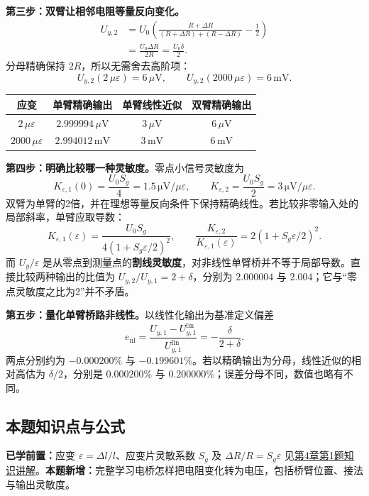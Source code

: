 \textbf{第三步：双臂让相邻电阻等量反向变化。}
\begin{align*}
U_{y,2}&=U_0\left(\frac{R+\Delta R}{(R+\Delta R)+(R-\Delta R)}-\frac12\right)\\
&=\boxed{\frac{U_0\Delta R}{2R}=\frac{U_0\delta}{2}}.
\end{align*}
分母精确保持 $2R$，所以无需舍去高阶项：
\[
\boxed{U_{y,2}(2\,\mu\varepsilon)=6\,\mu\mathrm V},\qquad
\boxed{U_{y,2}(2000\,\mu\varepsilon)=6\,\mathrm{mV}}.
\]

\begin{table}[H]
\centering\small
\begin{tabular}{@{}c c c c@{}}
\toprule
应变 & 单臂精确输出 & 单臂线性近似 & 双臂精确输出 \\
\midrule
$2\,\mu\varepsilon$ & $2.999994\,\mu\mathrm V$ & $3\,\mu\mathrm V$ & $6\,\mu\mathrm V$ \\
$2000\,\mu\varepsilon$ & $2.994012\,\mathrm{mV}$ & $3\,\mathrm{mV}$ & $6\,\mathrm{mV}$ \\
\bottomrule
\end{tabular}
\end{table}

\textbf{第四步：明确比较哪一种灵敏度。}零点小信号灵敏度为
\[
K_{\varepsilon,1}(0)=\frac{U_0S_g}{4}
=1.5\,\mathrm{\mu V}/\mu\varepsilon,
\qquad
K_{\varepsilon,2}=\frac{U_0S_g}{2}
=3\,\mathrm{\mu V}/\mu\varepsilon.
\]
双臂为单臂的2倍，并在理想等量反向条件下保持精确线性。若比较非零输入处的局部斜率，单臂应取导数：
\[
K_{\varepsilon,1}(\varepsilon)
=\frac{U_0S_g}{4(1+S_g\varepsilon/2)^2},\qquad
\frac{K_{\varepsilon,2}}{K_{\varepsilon,1}(\varepsilon)}
=2(1+S_g\varepsilon/2)^2.
\]
而 $U_y/\varepsilon$ 是从零点到测量点的\textbf{割线灵敏度}，对非线性单臂桥并不等于局部导数。直接比较两种输出的比值为 $U_{y,2}/U_{y,1}=2+\delta$，分别为 $2.000004$ 与 $2.004$；它与“零点灵敏度之比为2”并不矛盾。

\textbf{第五步：量化单臂桥路非线性。}以线性化输出为基准定义偏差
\[
e_{\mathrm{nl}}=\frac{U_{y,1}-U_{y,1}^{\mathrm{lin}}}{U_{y,1}^{\mathrm{lin}}}
=-\frac{\delta}{2+\delta}.
\]
两点分别约为 $-0.000200\%$ 与 $-0.199601\%$。若以精确输出为分母，线性近似的相对高估为 $\delta/2$，分别是 $0.000200\%$ 与 $0.200000\%$；误差分母不同，数值也略有不同。


\subsection*{本题知识点与公式}\label{kn:5-1}
\noindent\textbf{已学前置：}应变 $\varepsilon=\Delta l/l$、应变片灵敏系数 $S_g$ 及 $\Delta R/R=S_g\varepsilon$ 见\hyperref[kn:4-1]{第4章第1题知识讲解}。\textbf{本题新增：}完整学习电桥怎样把电阻变化转为电压，包括桥臂位置、接法与输出灵敏度。

